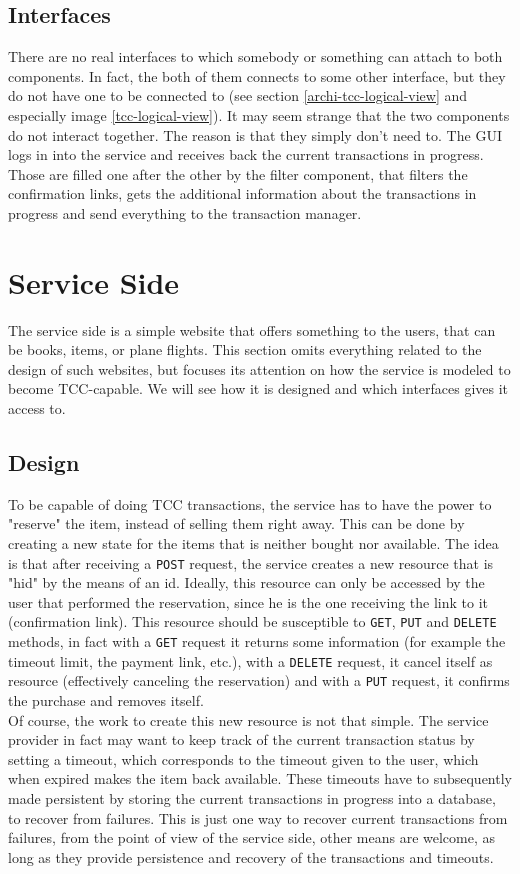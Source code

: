 \subsection{Interfaces}
There are no real interfaces to which somebody or something can attach to both components. In fact, the both of them connects to some other interface, but they do not have one to be connected to (see section \ref{archi-tcc-logical-view} and especially image \ref{tcc-logical-view}). It may seem strange that the two components do not interact together. The reason is that they simply don't need to. The GUI logs in into the service and receives back the current transactions in progress. Those are filled one after the other by the filter component, that filters the confirmation links, gets the additional information about the transactions in progress and send everything to the transaction manager.

\section{Service Side}
The service side is a simple website that offers something to the users, that can be books, items, or plane flights. This section omits everything related to the design of such websites, but focuses its attention on how the service is modeled to become TCC-capable. We will see how it is designed and which interfaces gives it access to.

\subsection{Design}
To be capable of doing TCC transactions, the service has to have the power to "reserve" the item, instead of selling them right away. This can be done by creating a new state for the items that is neither bought nor available. The idea is that after receiving a {\tt POST} request, the service creates a new resource that is "hid" by the means of an id. Ideally, this resource can only be accessed by the user that performed the reservation, since he is the one receiving the link to it (confirmation link). This resource should be susceptible to {\tt GET}, {\tt PUT} and {\tt DELETE} methods, in fact with a {\tt GET} request it returns some information (for example the timeout limit, the payment link, etc.), with a {\tt DELETE} request, it cancel itself as resource (effectively canceling the reservation) and with a {\tt PUT} request, it confirms the purchase and removes itself.\\
Of course, the work to create this new resource is not that simple. The service provider in fact may want to keep track of the current transaction status by setting a timeout, which corresponds to the timeout given to the user, which when expired makes the item back available. These timeouts have to subsequently made persistent by storing the current transactions in progress into a database, to recover from failures. This is just one way to recover current transactions from failures, from the point of view of the service side, other means are welcome, as long as they provide persistence and recovery of the transactions and timeouts.

